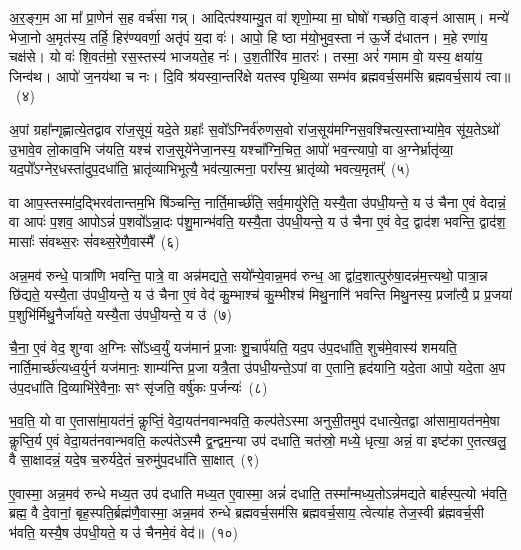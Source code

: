 अ॒र॒ङ्ग॒म आ मा᳚ प्रा॒णेन॑ स॒ह वर्च॑सा गन्न्। आदित्प॑श्याम्यु॒त वा॑ शृणो॒म्या मा॒ घोषो॑ गच्छति॒ वाङ्न॑ आसाम्। मन्ये॑ भेजा॒नो अ॒मृत॑स्य॒ तर्\mbox{}हि॒ हिर॑ण्यवर्णा॒ अतृ॑पं य॒दा वः॑। आपो॒ हि ष्ठा म॑यो॒भुव॒स्ता न॑ ऊ॒र्जे द॑धातन। म॒हे रणा॑य॒ चक्ष॑से। यो वः॑ शि॒वत॑मो॒ रस॒स्तस्य॑ भाजयते॒ह नः॑। उ॒श॒तीरि॑व मा॒तरः॑। तस्मा॒ अरं॑ गमाम वो॒ यस्य॒ क्षया॑य॒ जिन्व॑थ। आपो॑ ज॒नय॑था च नः। दि॒वि श्र॑यस्वा॒न्तरि॑क्षे यतस्व पृथि॒व्या सम्भ॑व ब्रह्मवर्च॒सम॑सि ब्रह्मवर्च॒साय॑ त्वा॥~(४)

{\anuvakamend[{उ॒न्दन्ति॑ स॒मव॑ल्गत मधु॒पृचां᳚ मा॒तरो॒ द्वाविꣳ॑शतिश्च}]}%

अ॒पां ग्रहा᳚न्गृह्णात्ये॒तद्वाव रा॑ज॒सूयं॒ यदे॒ते ग्रहाः᳚ स॒वो᳚\-ऽग्निर्व॑रुणस॒वो रा॑ज॒सूय॑मग्निस॒वश्चित्य॒स्ताभ्या॑मे॒व सू॑य॒ते\-ऽथो॑ उ॒भावे॒व लो॒काव॒भि ज॑यति॒ यश्च॑ राज॒सूये॑नेजा॒नस्य॒ यश्चा᳚ग्नि॒चित॒ आपो॑ भव॒न्त्यापो॒ वा अ॒ग्नेर्भ्रातृ॑व्या॒ यद॒पो᳚\-ऽग्नेर॒धस्ता॑दुप॒दधा॑ति॒ भ्रातृ॑व्याभिभूत्यै॒ भव॑त्या॒त्मना॒ परा᳚स्य॒ भ्रातृ॑व्यो भवत्य॒मृतम्᳚~(५)

वा आप॒स्तस्मा॑द॒द्भिरव॑तान्तम॒भि षि॑ञ्चन्ति॒ नार्ति॒मार्च्छ॑ति॒ सर्व॒मायु॑रेति॒ यस्यै॒ता उ॑पधी॒यन्ते॒ य उ॑ चैना ए॒वं वेदान्नं॒ वा आपः॑ प॒शव॒ आपो\-ऽन्नं॑ प॒शवो᳚\-ऽन्ना॒दः प॑शु॒मान्भ॑वति॒ यस्यै॒ता उ॑पधी॒यन्ते॒ य उ॑ चैना ए॒वं वेद॒ द्वाद॑श भवन्ति॒ द्वाद॑श॒ मासाः᳚ संवथ्स॒रः सं॑वथ्स॒रेणै॒वास्मै᳚~(६)

अन्न॒मव॑ रुन्धे॒ पात्रा॑णि भवन्ति॒ पात्रे॒ वा अन्न॑मद्यते॒ सयो᳚न्ये॒वान्न॒मव॑ रुन्ध॒ आ द्वा॑द॒शात्पुरु॑षा॒दन्न॑म॒त्त्यथो॒ पात्रा॒न्न छि॑द्यते॒ यस्यै॒ता उ॑पधी॒यन्ते॒ य उ॑ चैना ए॒वं वेद॑ कु॒म्भाश्च॑ कु॒म्भीश्च॑ मिथु॒नानि॑ भवन्ति मिथु॒नस्य॒ प्रजा᳚त्यै॒ प्र प्र॒जया॑ प॒शुभि॑र्मिथु॒नैर्जा॑यते॒ यस्यै॒ता उ॑पधी॒यन्ते॒ य उ॑~(७)

चै॒ना॒ ए॒वं वेद॒ शुग्वा अ॒ग्निः सो᳚\-ऽध्व॒र्युं यज॑मानं प्र॒जाः शु॒चार्प॑यति॒ यद॒प उ॑प॒दधा॑ति॒ शुच॑मे॒वास्य॑ शमयति॒ नार्ति॒मार्च्छ॑त्यध्व॒र्युर्न यज॑मानः॒ शाम्य॑न्ति प्र॒जा यत्रै॒ता उ॑पधी॒यन्ते॒\-ऽपां वा ए॒तानि॒ हृद॑यानि॒ यदे॒ता आपो॒ यदे॒ता अ॒प उ॑प॒दधा॑ति दि॒व्याभि॑रे॒वैनाः॒ सꣳ सृ॑जति॒ वर्\mbox{}षु॑कः प॒र्जन्यः॑~(८)

भ॒व॒ति॒ यो वा ए॒तासा॑मा॒यत॑नं॒ कॢप्तिं॒ वेदा॒यत॑नवान्भवति॒ कल्प॑ते\-ऽस्मा अनुसी॒तमुप॑ दधात्ये॒तद्वा आ॑सामा॒यत॑नमे॒षा कॢप्ति॒र्य ए॒वं वेदा॒यत॑नवान्भवति॒ कल्प॑ते\-ऽस्मै द्व॒न्द्वम॒न्या उप॑ दधाति॒ चत॑स्रो॒ मध्ये॒ धृत्या॒ अन्नं॒ वा इष्ट॑का ए॒तत्खलु॒ वै सा॒क्षादन्नं॒ यदे॒ष च॒रुर्यदे॒तं च॒रुमु॑प॒दधा॑ति सा॒क्षात्~(९)

ए॒वास्मा॒ अन्न॒मव॑ रुन्धे मध्य॒त उप॑ दधाति मध्य॒त ए॒वास्मा॒ अन्नं॑ दधाति॒ तस्मा᳚न्मध्य॒तो\-ऽन्न॑मद्यते बार्\mbox{}हस्प॒त्यो भ॑वति॒ ब्रह्म॒ वै दे॒वानां॒ बृह॒स्पति॒र्ब्रह्म॑णै॒वास्मा॒ अन्न॒मव॑ रुन्धे ब्रह्मवर्च॒सम॑सि ब्रह्मवर्च॒साय॒ त्वेत्या॑ह तेज॒स्वी ब्र॑ह्मवर्च॒सी भ॑वति॒ यस्यै॒ष उ॑पधी॒यते॒ य उ॑ चैनमे॒वं वेद॑॥~(१०)

